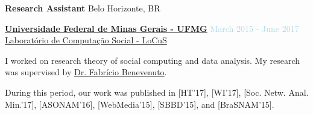 \medskip


\textbf{Research Assistant} \hfill {Belo Horizonte, BR}
\begin{outerlist}

\item[] \href{https://ufmg.br/}{\textbf{Universidade Federal de Minas Gerais - UFMG}}  \hfill {\textcolor{lightblue}{March 2015 - June 2017}}
\\ \href{https://www.dcc.ufmg.br/dcc/?q=pt-br/node/2728}{Laboratório de Computação Social - LoCuS}  \medskip 

        \begin{innerlist}[-]
        \item I worked on research theory of social computing and data analysis. My research was supervised by \href{https://homepages.dcc.ufmg.br/~fabricio/}{Dr. Fabrício Benevenuto}.
        \item During this period, our work was published in [HT'17], [WI'17], [Soc. Netw. Anal. Min.'17], [ASONAM'16], [WebMedia'15], [SBBD'15], and [BraSNAM'15]. 
        \end{innerlist}

\end{outerlist}

\medskip



